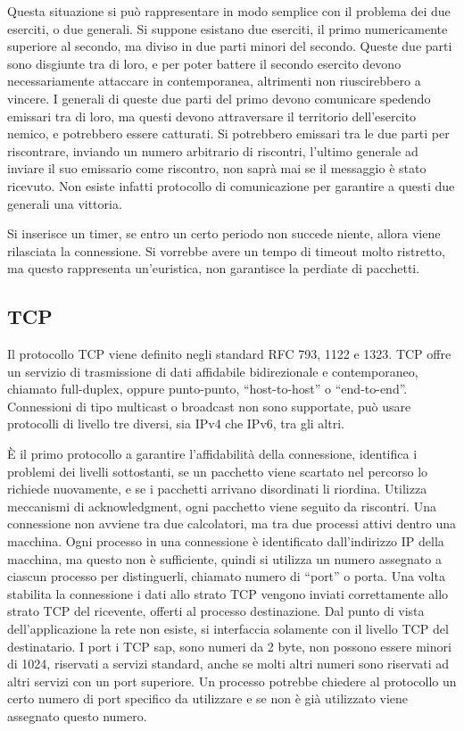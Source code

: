 \documentclass{article}
\numberwithin{equation}{subsection}
\begin{document}
Questa situazione si può rappresentare in modo semplice con il problema dei due eserciti, o due generali. Si suppone esistano due eserciti, il primo numericamente 
superiore al secondo, ma diviso in due parti minori del secondo. Queste due parti sono disgiunte tra di loro, e per poter battere il secondo esercito devono 
necessariamente attaccare in contemporanea, altrimenti non riuscirebbero a vincere. I generali di queste due parti del primo devono comunicare spedendo 
emissari tra di loro, ma questi devono attraversare il territorio dell'esercito nemico, e potrebbero essere catturati. 
Si potrebbero emissari tra le due parti per riscontrare, inviando un numero arbitrario di riscontri, l'ultimo generale ad inviare il suo emissario come 
riscontro, non saprà mai se il messaggio è stato ricevuto. Non esiste infatti protocollo di comunicazione per garantire a questi due generali una vittoria. 

Si inserisce un timer, se entro un certo periodo non succede niente, allora viene rilasciata la connessione. Si vorrebbe avere un tempo di timeout molto ristretto, ma 
questo rappresenta un'euristica, non garantisce la perdiate di pacchetti. 

\subsection{TCP}

Il protocollo TCP viene definito negli standard RFC 793, 1122 e 1323. TCP offre un servizio di trasmissione di dati affidabile bidirezionale e contemporaneo, chiamato 
full-duplex, oppure punto-punto, ``host-to-host'' o ``end-to-end''. Connessioni di tipo multicast o broadcast non sono supportate, può usare protocolli di livello tre 
diversi, sia IPv4 che IPv6, tra gli altri. 


\`{E} il primo protocollo a garantire l'affidabilità della connessione, identifica i problemi dei livelli sottostanti, se un pacchetto viene scartato nel percorso lo 
richiede nuovamente, e se i pacchetti arrivano disordinati li riordina. Utilizza meccanismi di acknowledgment, ogni pacchetto viene seguito da riscontri. Una 
connessione non avviene tra due calcolatori, ma tra due processi attivi dentro una macchina. Ogni processo in una connessione è identificato dall'indirizzo IP della 
macchina, ma questo non è sufficiente, quindi si utilizza un numero assegnato a ciascun processo per distinguerli, chiamato numero di ``port'' o porta. Una volta 
stabilita la connessione i dati allo strato TCP vengono inviati correttamente allo strato TCP del ricevente, offerti al processo destinazione. Dal punto di vista 
dell'applicazione la rete non esiste, si interfaccia solamente con il livello TCP del destinatario. 
I port i TCP sap, sono numeri da 2 byte, non possono essere minori di 1024, riservati a servizi standard, anche se molti altri numeri sono riservati ad altri servizi con 
un port superiore. 
Un processo potrebbe chiedere al protocollo un certo numero di port specifico da utilizzare e se non è già utilizzato viene assegnato questo numero. 
\end{document}
